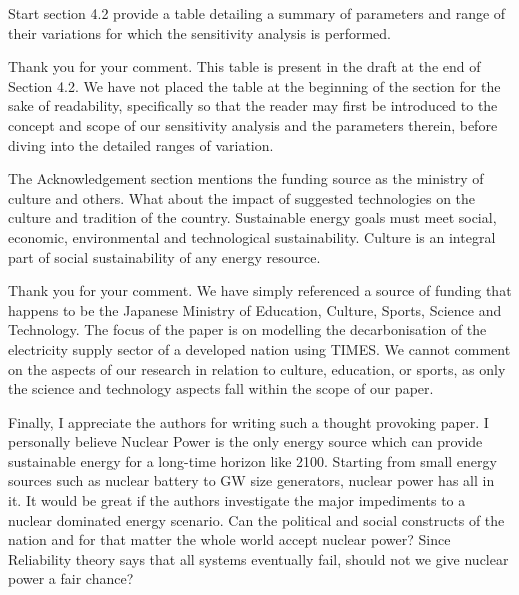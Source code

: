 \documentclass[answers,11pt]{exam}
\begin{document}
\begin{questions}
\begin{solution}
                 
        \end{solution}     
        
                        \question   Start section 4.2 provide a table detailing a summary of parameters and range of their variations for which the sensitivity analysis is performed.
                                
        \begin{solution}
        
                 Thank you for your comment. This table is present in the draft at the end of Section 4.2. We have not placed the table at the beginning of the section for the sake of readability, specifically so that the reader may first be introduced to the concept and scope of our sensitivity analysis and the parameters therein, before diving into the detailed ranges of variation.
                 
                 
        \end{solution} 
                        \question   The Acknowledgement section mentions the funding source as the ministry of culture and others. What about the impact of suggested technologies on the culture and tradition of the country. Sustainable energy goals must meet social, economic, environmental and technological sustainability. Culture is an integral part of social sustainability of any energy resource. 
                                
        \begin{solution}
        
                 Thank you for your comment. We have simply referenced a source of funding that happens to be the Japanese Ministry of Education, Culture, Sports, Science and Technology. The focus of the paper is on modelling the decarbonisation of the electricity supply sector of a developed nation using TIMES. We cannot comment on the aspects of our research in relation to culture, education, or sports, as only the science and technology aspects fall within the scope of our paper.
                 
                 
        \end{solution} 
                        \question   Finally, I appreciate the authors for writing such a  thought provoking paper. I personally believe Nuclear Power is the only energy source which can provide sustainable energy for a long-time horizon like 2100. Starting from small energy sources such as nuclear battery to GW size generators, nuclear power has all in it. It would be great if the authors investigate the major impediments to a nuclear dominated energy scenario. Can the political and social constructs of the nation and for that matter the whole world accept nuclear power? Since Reliability theory says that all systems eventually fail, should not we give nuclear power a fair chance?  
                                

\end{questions}
\end{document}
